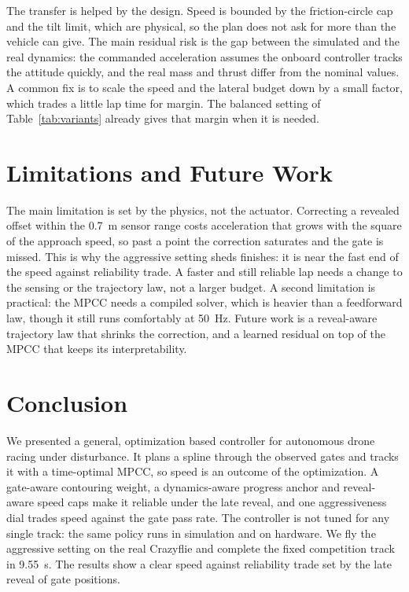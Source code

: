 \documentclass[conference]{IEEEtran}
\begin{document}
The transfer is helped by the design. Speed is bounded by the friction-circle cap and the tilt limit, which are physical, so the plan does not ask for more than the vehicle can give. The main residual risk is the gap between the simulated and the real dynamics: the commanded acceleration assumes the onboard controller tracks the attitude quickly, and the real mass and thrust differ from the nominal values. A common fix is to scale the speed and the lateral budget down by a small factor, which trades a little lap time for margin. The balanced setting of Table~\ref{tab:variants} already gives that margin when it is needed.

\section{Limitations and Future Work}
\label{sec:limits}
The main limitation is set by the physics, not the actuator. Correcting a revealed offset within the 0.7~m sensor range costs acceleration that grows with the square of the approach speed, so past a point the correction saturates and the gate is missed. This is why the aggressive setting sheds finishes: it is near the fast end of the speed against reliability trade. A faster and still reliable lap needs a change to the sensing or the trajectory law, not a larger budget. A second limitation is practical: the MPCC needs a compiled solver, which is heavier than a feedforward law, though it still runs comfortably at 50~Hz. Future work is a reveal-aware trajectory law that shrinks the correction, and a learned residual on top of the MPCC that keeps its interpretability.

\section{Conclusion}
We presented a general, optimization based controller for autonomous drone racing under disturbance. It plans a spline through the observed gates and tracks it with a time-optimal MPCC, so speed is an outcome of the optimization. A gate-aware contouring weight, a dynamics-aware progress anchor and reveal-aware speed caps make it reliable under the late reveal, and one aggressiveness dial trades speed against the gate pass rate. The controller is not tuned for any single track: the same policy runs in simulation and on hardware. We fly the aggressive setting on the real Crazyflie and complete the fixed competition track in 9.55~s. The results show a clear speed against reliability trade set by the late reveal of gate positions.
\end{document}
